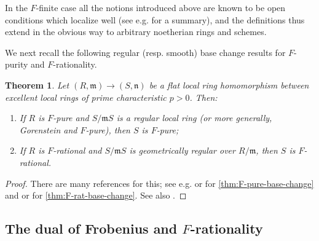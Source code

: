 \documentclass[reqno,11pt]{amsart}
\numberwithin{equation}{section}
\newtheorem{theorem}{Theorem}[section]
\theoremstyle{definition}
\theoremstyle{definition}
\theoremstyle{definition}
\theoremstyle{remark}
\newcommand{\fm}{\mathfrak{m}}
\newcommand{\fn}{\mathfrak{n}}
\begin{document}
In the $F$-finite case all the notions introduced above are known to be open conditions which localize well (see e.g. \cite[Section 6]{MP25} for a summary), and the definitions thus extend in the obvious way to arbitrary noetherian rings and schemes.



We next recall the following regular (resp. smooth) base change results for $F$-purity and $F$-rationality.
\begin{theorem}\label{thm:F-sing-base-change}
    Let $(R,\fm)\to (S,\fn)$ be a flat local ring homomorphism between excellent local rings of prime characteristic $p>0$. Then:
\begin{enumerate}[label=(\roman*)]
    \item If $R$ is $F$-pure and $S/\fm S$ is a regular local ring (or more generally, Gorenstein and $F$-pure), then $S$ is $F$-pure;\label{thm:F-pure-base-change}
    \item If $R$ is $F$-rational and $S/\fm S$ is geometrically regular over $R/\fm$, then $S$ is $F$-rational. \label{thm:F-rat-base-change}
\end{enumerate}
\end{theorem}
\begin{proof}
    There are many references for this; see e.g. \cite[Proposition 5.4]{Ma14} or \cite[Theorem 7.4]{MP25} for \ref{thm:F-pure-base-change} and \cite[Theorem 3.1]{Vel95} or \cite[Theorem 7.8]{MP25} for \ref{thm:F-rat-base-change}. See also \cite{Ene00}.
\end{proof}


\subsection{The dual of Frobenius and \texorpdfstring{$F$}{F}-rationality}
\end{document}
